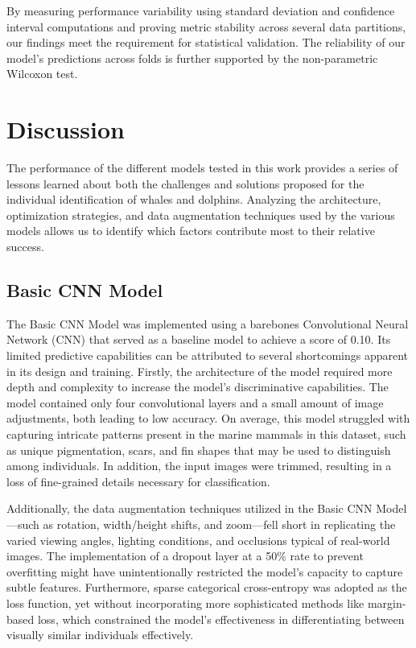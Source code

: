 \documentclass[twocolumn]{article}
\begin{document}
By measuring performance variability using standard deviation and confidence interval computations and proving metric stability across several data partitions, our findings meet the requirement for statistical validation. The reliability of our model's predictions across folds is further supported by the non-parametric Wilcoxon test. 

\section{Discussion}

The performance of the different models tested in this work provides a series of lessons learned about both the challenges and solutions proposed for the individual identification of whales and dolphins. Analyzing the architecture, optimization strategies, and data augmentation techniques used by the various models allows us to identify which factors contribute most to their relative success.

\subsection{Basic CNN Model}

The Basic CNN Model was implemented using a barebones Convolutional Neural Network (CNN) that served as a baseline model to achieve a score of 0.10. Its limited predictive capabilities can be attributed to several shortcomings apparent in its design and training. Firstly, the architecture of the model required more depth and complexity to increase the model’s discriminative capabilities. The model contained only four convolutional layers and a small amount of image adjustments, both leading to low accuracy. On average, this model struggled with capturing intricate patterns present in the marine mammals in this dataset, such as unique pigmentation, scars, and fin shapes that may be used to distinguish among individuals. In addition, the input images were trimmed, resulting in a loss of fine-grained details necessary for classification. 

Additionally, the data augmentation techniques utilized in the Basic CNN Model—such as rotation, width/height shifts, and zoom—fell short in replicating the varied viewing angles, lighting conditions, and occlusions typical of real-world images. The implementation of a dropout layer at a 50\% rate to prevent overfitting might have unintentionally restricted the model’s capacity to capture subtle features. Furthermore, sparse categorical cross-entropy was adopted as the loss function, yet without incorporating more sophisticated methods like margin-based loss, which constrained the model’s effectiveness in differentiating between visually similar individuals effectively.
\end{document}
